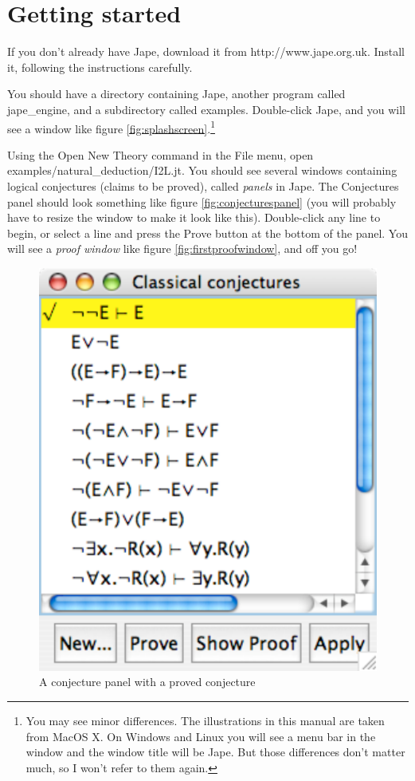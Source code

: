 \documentclass[11pt]{book}
\newcommand{\figref}[1]{figure \ref{fig:#1}}
\begin{document}
\section{Getting started}

If you don't already have Jape, download it from http://www.jape.org.uk. Install it, following the instructions carefully.

You should have a directory containing Jape, another program called jape\_engine, and a subdirectory called examples. Double-click Jape, and you will see a window like \figref{splashscreen}.\footnote{You may see minor differences. The illustrations in this manual are taken from MacOS X. On Windows and Linux you will see a menu bar in the window and the window title will be Jape. But those differences don't matter much, so I won't refer to them again.}

Using the Open New Theory command in  the File menu, open examples/natural\_deduction/I2L.jt. You should see several windows containing logical conjectures (claims to be proved), called \emph{panels} in Jape. The Conjectures panel should look something like \figref{conjecturespanel} (you will probably have to resize the window to make it look like this). Double-click any line to begin, or select a line and press the Prove button at the bottom of the panel. You will see a \emph{proof window} like \figref{firstproofwindow}, and off you go!

\begin{figure}
\centering
\includegraphics[scale=0.5]{pics/provedconjecture}
\caption{A conjecture panel with a proved conjecture}
\label{fig:provedconjecture}
\end{figure}
\end{document}

